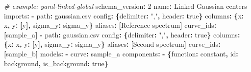 \documentclass[
  10pt,
  a4paper,
  oneside]{scrreprt}
\newenvironment{Shaded}{}{}
\newcommand{\AttributeTok}[1]{\textcolor[rgb]{0.49,0.56,0.16}{#1}}
\newcommand{\CharTok}[1]{\textcolor[rgb]{0.25,0.44,0.63}{#1}}
\newcommand{\CommentTok}[1]{\textcolor[rgb]{0.38,0.63,0.69}{\textit{#1}}}
\newcommand{\DecValTok}[1]{\textcolor[rgb]{0.25,0.63,0.44}{#1}}
\newcommand{\FunctionTok}[1]{\textcolor[rgb]{0.02,0.16,0.49}{#1}}
\newcommand{\KeywordTok}[1]{\textcolor[rgb]{0.00,0.44,0.13}{\textbf{#1}}}
\newcommand{\StringTok}[1]{\textcolor[rgb]{0.25,0.44,0.63}{#1}}
\begin{document}
\begin{Shaded}
\begin{Highlighting}[]
\CommentTok{\# example: yaml{-}linked{-}global}
\FunctionTok{schema\_version}\KeywordTok{:}\AttributeTok{ }\DecValTok{2}
\FunctionTok{name}\KeywordTok{:}\AttributeTok{ Linked Gaussian centers}
\FunctionTok{imports}\KeywordTok{:}
\AttributeTok{  }\KeywordTok{{-}}\AttributeTok{ }\FunctionTok{path}\KeywordTok{:}\AttributeTok{ gaussian.csv}
\AttributeTok{    }\FunctionTok{config}\KeywordTok{:}\AttributeTok{ }\KeywordTok{\{}\FunctionTok{delimiter}\KeywordTok{:}\AttributeTok{ }\StringTok{","}\KeywordTok{,}\AttributeTok{ }\FunctionTok{header}\KeywordTok{:}\AttributeTok{ }\CharTok{true}\KeywordTok{\}}
\AttributeTok{    }\FunctionTok{columns}\KeywordTok{:}\AttributeTok{ }\KeywordTok{\{}\FunctionTok{x}\KeywordTok{:}\AttributeTok{ x}\KeywordTok{,}\AttributeTok{ }\FunctionTok{y}\KeywordTok{:}\AttributeTok{ }\KeywordTok{[}\CharTok{y}\KeywordTok{],}\AttributeTok{ }\FunctionTok{sigma\_y}\KeywordTok{:}\AttributeTok{ sigma\_y}\KeywordTok{\}}
\AttributeTok{    }\FunctionTok{aliases}\KeywordTok{:}\AttributeTok{ }\KeywordTok{[}\AttributeTok{Reference spectrum}\KeywordTok{]}
\AttributeTok{    }\FunctionTok{curve\_ids}\KeywordTok{:}\AttributeTok{ }\KeywordTok{[}\AttributeTok{sample\_a}\KeywordTok{]}
\AttributeTok{  }\KeywordTok{{-}}\AttributeTok{ }\FunctionTok{path}\KeywordTok{:}\AttributeTok{ gaussian.csv}
\AttributeTok{    }\FunctionTok{config}\KeywordTok{:}\AttributeTok{ }\KeywordTok{\{}\FunctionTok{delimiter}\KeywordTok{:}\AttributeTok{ }\StringTok{","}\KeywordTok{,}\AttributeTok{ }\FunctionTok{header}\KeywordTok{:}\AttributeTok{ }\CharTok{true}\KeywordTok{\}}
\AttributeTok{    }\FunctionTok{columns}\KeywordTok{:}\AttributeTok{ }\KeywordTok{\{}\FunctionTok{x}\KeywordTok{:}\AttributeTok{ x}\KeywordTok{,}\AttributeTok{ }\FunctionTok{y}\KeywordTok{:}\AttributeTok{ }\KeywordTok{[}\CharTok{y}\KeywordTok{],}\AttributeTok{ }\FunctionTok{sigma\_y}\KeywordTok{:}\AttributeTok{ sigma\_y}\KeywordTok{\}}
\AttributeTok{    }\FunctionTok{aliases}\KeywordTok{:}\AttributeTok{ }\KeywordTok{[}\AttributeTok{Second spectrum}\KeywordTok{]}
\AttributeTok{    }\FunctionTok{curve\_ids}\KeywordTok{:}\AttributeTok{ }\KeywordTok{[}\AttributeTok{sample\_b}\KeywordTok{]}
\FunctionTok{models}\KeywordTok{:}
\AttributeTok{  }\KeywordTok{{-}}\AttributeTok{ }\FunctionTok{curve}\KeywordTok{:}\AttributeTok{ sample\_a}
\AttributeTok{    }\FunctionTok{components}\KeywordTok{:}
\AttributeTok{      }\KeywordTok{{-}}\AttributeTok{ }\KeywordTok{\{}\FunctionTok{function}\KeywordTok{:}\AttributeTok{ constant}\KeywordTok{,}\AttributeTok{ }\FunctionTok{id}\KeywordTok{:}\AttributeTok{ background}\KeywordTok{,}\AttributeTok{ }\FunctionTok{is\_background}\KeywordTok{:}\AttributeTok{ }\CharTok{true}\KeywordTok{\}}

\end{Highlighting}
\end{Shaded}
\end{document}
